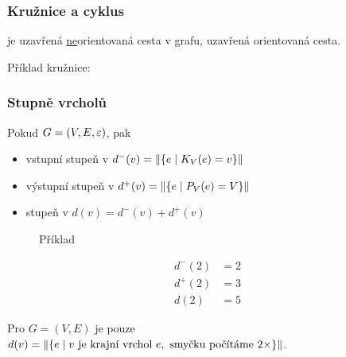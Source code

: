 \subsubsection{Kružnice a cyklus}
 je uzavřená \underline{ne}orientovaná cesta v grafu,  uzavřená orientovaná cesta.

Příklad kružnice:
\begin{figure}[H]
\end{figure}

\newpage
\subsubsection{Stupně vrcholů}
Pokud $G = (V, E, \varepsilon)$, pak
\begin{itemize}
    \item vstupní stupeň v $d^- (v) = \left\|\left\lbrace e \mid K_V(e) = v \right\rbrace\right\|$
    \item výstupní stupeň v $d^+ (v) = \left\| \left\lbrace e \mid P_V(e)=V \right\rbrace\right\|$
    \item stupeň v $d(v) = d^-(v) + d^+(v)$
\end{itemize}
\begin{figure}[H]
    \centering
    \begin{minipage}[c]{0.32\textwidth}
        Příklad
        \begin{figure}[H]
        \end{figure}
        
    \end{minipage}%
    \hspace{-0.1\textwidth}
    \begin{minipage}[c]{0.68\textwidth}
        \begin{align*}
            d^-(2) &= 2 \\
            d^+(2) &= 3 \\
            d(2) &= 5
        \end{align*}
    \end{minipage}
\end{figure}
Pro $G=(V,E)$ je pouze $d(v) = \left\|\left\lbrace e \mid v \text{ je krajní vrchol } e, \text{ smyčku počítáme } 
2\times \right\rbrace\right\|$.

